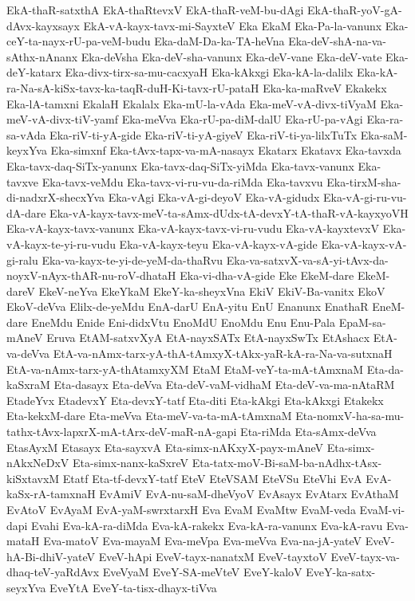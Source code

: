 {EkA-thaR-satxthA
EkA-thaRtevxV
EkA-thaR-veM-bu-dAgi
EkA-thaR-yoV-gA-dAvx-kayxsayx
EkA-vA-kayx-tavx-mi-SayxteV
Eka
EkaM
Eka-Pa-la-vanunx
Eka-ceY-ta-nayx-rU-pa-veM-budu
Eka-daM-Da-ka-TA-heVna
Eka-deV-shA-na-va-sAthx-nAnanx
Eka-deVsha
Eka-deV-sha-vanunx
Eka-deV-vane
Eka-deV-vate
Eka-deY-katarx
Eka-divx-tirx-sa-mu-cacxyaH
Eka-kAkxgi
Eka-kA-la-dalilx
Eka-kA-ra-Na-sA-kiSx-tavx-ka-taqR-duH-Ki-tavx-rU-pataH
Eka-ka-maRveV
Ekakekx
Eka-lA-tamxni
EkalaH
Ekalalx
Eka-mU-la-vAda
Eka-meV-vA-divx-tiVyaM
Eka-meV-vA-divx-tiV-yamf
Eka-meVva
Eka-rU-pa-diM-dalU
Eka-rU-pa-vAgi
Eka-ra-sa-vAda
Eka-riV-ti-yA-gide
Eka-riV-ti-yA-giyeV
Eka-riV-ti-ya-lilxTuTx
Eka-saM-keyxYva
Eka-simxnf
Eka-tAvx-tapx-va-mA-nasayx
Ekatarx
Ekatavx
Eka-tavxda
Eka-tavx-daq-SiTx-yanunx
Eka-tavx-daq-SiTx-yiMda
Eka-tavx-vanunx
Eka-tavxve
Eka-tavx-veMdu
Eka-tavx-vi-ru-vu-da-riMda
Eka-tavxvu
Eka-tirxM-sha-di-nadxrX-shecxYva
Eka-vAgi
Eka-vA-gi-deyoV
Eka-vA-gidudx
Eka-vA-gi-ru-vu-dA-dare
Eka-vA-kayx-tavx-meV-ta-sAmx-dUdx-tA-devxY-tA-thaR-vA-kayxyoVH
Eka-vA-kayx-tavx-vanunx
Eka-vA-kayx-tavx-vi-ru-vudu
Eka-vA-kayxtevxV
Eka-vA-kayx-te-yi-ru-vudu
Eka-vA-kayx-teyu
Eka-vA-kayx-vA-gide
Eka-vA-kayx-vA-gi-ralu
Eka-va-kayx-te-yi-de-yeM-da-thaRvu
Eka-va-satxvX-va-sA-yi-tAvx-da-noyxV-nAyx-thAR-nu-roV-dhataH
Eka-vi-dha-vA-gide
Eke
EkeM-dare
EkeM-dareV
EkeV-neYva
EkeYkaM
EkeY-ka-sheyxVna
EkiV
EkiV-Ba-vanitx
EkoV
EkoV-deVva
Elilx-de-yeMdu
EnA-darU
EnA-yitu
EnU
Enanunx
EnathaR
EneM-dare
EneMdu
Enide
Eni-didxVtu
EnoMdU
EnoMdu
Enu
Enu-Pala
EpaM-sa-mAneV
Eruva
EtAM-satxvXyA
EtA-nayxSATx
EtA-nayxSwTx
EtAshacx
EtA-va-deVva
EtA-va-nAmx-tarx-yA-thA-tAmxyX-tAkx-yaR-kA-ra-Na-va-sutxnaH
EtA-va-nAmx-tarx-yA-thAtamxyXM
EtaM
EtaM-veY-ta-mA-tAmxnaM
Eta-da-kaSxraM
Eta-dasayx
Eta-deVva
Eta-deV-vaM-vidhaM
Eta-deV-va-ma-nAtaRM
EtadeYvx
EtadevxY
Eta-devxY-tatf
Eta-diti
Eta-kAkgi
Eta-kAkxgi
Etakekx
Eta-kekxM-dare
Eta-meVva
Eta-meV-va-ta-mA-tAmxnaM
Eta-nomxV-ha-sa-mu-tathx-tAvx-lapxrX-mA-tArx-deV-maR-nA-gapi
Eta-riMda
Eta-sAmx-deVva
EtasAyxM
Etasayx
Eta-sayxvA
Eta-simx-nAKxyX-payx-mAneV
Eta-simx-nAkxNeDxV
Eta-simx-nanx-kaSxreV
Eta-tatx-moV-Bi-saM-ba-nAdhx-tAsx-kiSxtavxM
Etatf
Eta-tf-devxY-tatf
EteV
EteVSAM
EteVSu
EteVhi
EvA
EvA-kaSx-rA-tamxnaH
EvAmiV
EvA-nu-saM-dheVyoV
EvAsayx
EvAtarx
EvAthaM
EvAtoV
EvAyaM
EvA-yaM-swrxtarxH
Eva
EvaM
EvaMtw
EvaM-veda
EvaM-vi-dapi
Evahi
Eva-kA-ra-diMda
Eva-kA-rakekx
Eva-kA-ra-vanunx
Eva-kA-ravu
Eva-mataH
Eva-matoV
Eva-mayaM
Eva-meVpa
Eva-meVva
Eva-na-jA-yateV
EveV-hA-Bi-dhiV-yateV
EveV-hApi
EveV-tayx-nanatxM
EveV-tayxtoV
EveV-tayx-va-dhaq-teV-yaRdAvx
EveVyaM
EveY-SA-meVteV
EveY-kaloV
EveY-ka-satx-seyxYva
EveYtA
EveY-ta-tisx-dhayx-tiVva
}
